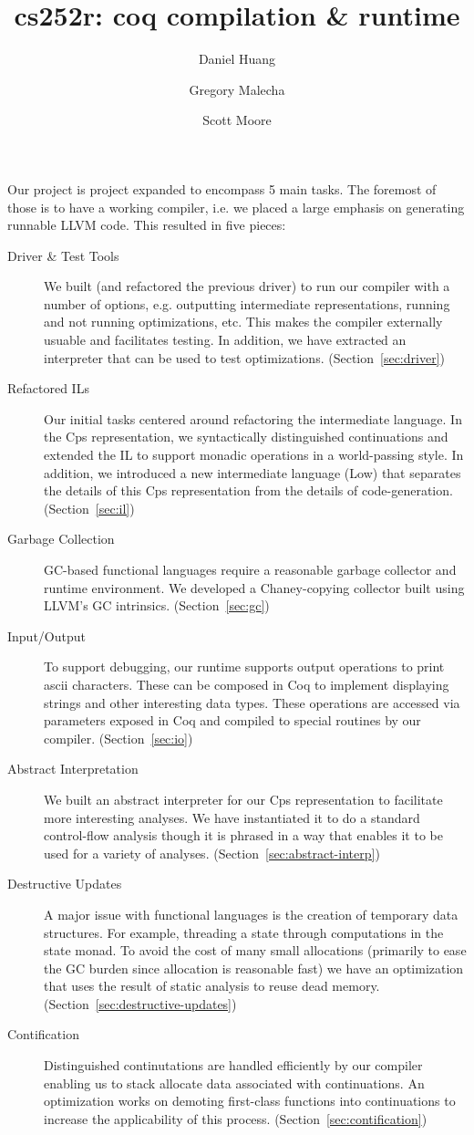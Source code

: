 \documentclass{article}
\title{cs252r: coq compilation \& runtime}
\author{Daniel Huang \and Gregory Malecha \and Scott Moore}
\begin{document}
\maketitle

Our project is project expanded to encompass 5 main tasks. The foremost of those is to have a working compiler, i.e. we placed a large emphasis on generating runnable LLVM code. This resulted in five pieces:

\begin{description}
\item[Driver \& Test Tools]
We built (and refactored the previous driver) to run our compiler with a number of options, e.g. outputting intermediate representations, running and not running optimizations, etc. This makes the compiler externally usuable and facilitates testing. In addition, we have extracted an interpreter that can be used to test optimizations. (Section~\ref{sec:driver})
\item[Refactored ILs]
Our initial tasks centered around refactoring the intermediate language. In the Cps representation, we syntactically distinguished continuations and extended the IL to support monadic operations in a world-passing style. In addition, we introduced a new intermediate language (Low) that separates the details of this Cps representation from the details of code-generation. (Section~\ref{sec:il})
\item[Garbage Collection]
GC-based functional languages require a reasonable garbage collector and runtime environment. We developed a Chaney-copying collector built using LLVM's GC intrinsics. (Section~\ref{sec:gc})
\item[Input/Output]
To support debugging, our runtime supports output operations to print ascii characters. These can be composed in Coq to implement displaying strings and other interesting data types. These operations are accessed via parameters exposed in Coq and compiled to special routines by our compiler. (Section~\ref{sec:io})
\item[Abstract Interpretation] 
We built an abstract interpreter for our Cps representation to facilitate more interesting analyses. We have instantiated it to do a standard control-flow analysis though it is phrased in a way that enables it to be used for a variety of analyses. (Section~\ref{sec:abstract-interp})
\item[Destructive Updates]
A major issue with functional languages is the creation of temporary data structures. For example, threading a state through computations in the state monad. To avoid the cost of many small allocations (primarily to ease the GC burden since allocation is reasonable fast) we have an optimization that uses the result of static analysis to reuse dead memory. (Section~\ref{sec:destructive-updates})
\item[Contification]
Distinguished continutations are handled efficiently by our compiler enabling us to stack allocate data associated with continuations. An optimization works on demoting first-class functions into continuations to increase the applicability of this process. (Section~\ref{sec:contification})
\end{description}
\end{document}
